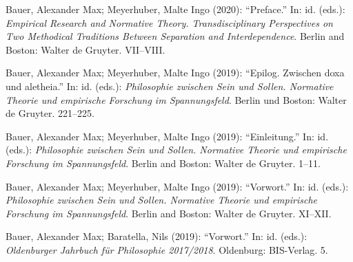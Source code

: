 \documentclass[a4paper,10pt]{article}
\newenvironment{literature}{%
   \parskip6pt\parindent0pt\raggedright
   \def\lititem{\hangindent=1cm\hangafter1}}{%
   \par\ignorespaces}
\begin{document}
\begin{literature}
\lititem Bauer, Alexander Max; Meyerhuber, Malte Ingo (2020): \enquote{Preface.} In: id. (eds.): \textit{Empirical Research and Normative Theory. Transdisciplinary Perspectives on Two Methodical Traditions Between Separation and Interdependence}. Berlin and Boston: Walter de Gruyter. VII--VIII.

\lititem Bauer, Alexander Max; Meyerhuber, Malte Ingo (2019): \enquote{Epilog. Zwischen doxa und aletheia.} In: id. (eds.): \textit{Philosophie zwischen Sein und Sollen. Normative Theorie und empirische Forschung im Spannungsfeld}. Berlin und Boston: Walter de Gruyter. 221--225.

\lititem Bauer, Alexander Max; Meyerhuber, Malte Ingo (2019): \enquote{Einleitung.} In: id. (eds.): \textit{Philosophie zwischen Sein und Sollen. Normative Theorie und empirische Forschung im Spannungsfeld}. Berlin and Boston: Walter de Gruyter. 1--11.

\lititem Bauer, Alexander Max; Meyerhuber, Malte Ingo (2019): \enquote{Vorwort.} In: id. (eds.): \textit{Philosophie zwischen Sein und Sollen. Normative Theorie und empirische Forschung im Spannungsfeld}. Berlin and Boston: Walter de Gruyter. XI--XII.

\lititem Bauer, Alexander Max; Baratella, Nils (2019): \enquote{Vorwort.} In: id. (eds.): \textit{Oldenburger Jahrbuch für Philosophie 2017/2018}. Oldenburg: BIS-Verlag. 5.
\end{literature}
\end{document}

